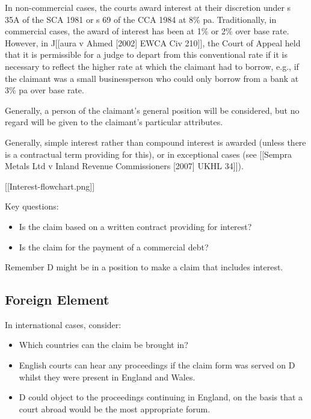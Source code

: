 \documentclass[
]{article}
\providecommand{\tightlist}{%
  \setlength{\itemsep}{0pt}\setlength{\parskip}{0pt}}
\begin{document}
In non-commercial cases, the courts award interest at their discretion
under s 35A of the SCA 1981 or s 69 of the CCA 1984 at 8\% pa.
Traditionally, in commercial cases, the award of interest has been at
1\% or 2\% over base rate. However, in J{[}{[}aura v Ahmed {[}2002{]}
EWCA Civ 210{]}{]}, the Court of Appeal held that it is permissible for
a judge to depart from this conventional rate if it is necessary to
reflect the higher rate at which the claimant had to borrow, e.g., if
the claimant was a small businessperson who could only borrow from a
bank at 3\% pa over base rate.

Generally, a person of the claimant's general position will be
considered, but no regard will be given to the claimant's particular
attributes.

Generally, simple interest rather than compound interest is awarded
(unless there is a contractual term providing for this), or in
exceptional cases (see {[}{[}Sempra Metals Ltd v Inland Revenue
Commissioners {[}2007{]} UKHL 34{]}{]}).

{[}{[}Interest-flowchart.png{]}{]}

Key questions:

\begin{itemize}
\tightlist
\item
  Is the claim based on a written contract providing for interest?
\item
  Is the claim for the payment of a commercial debt?
\end{itemize}

Remember D might be in a position to make a claim that includes
interest.

\hypertarget{foreign-element}{%
\subsection{Foreign Element}\label{foreign-element}}

In international cases, consider:

\begin{itemize}
\tightlist
\item
  Which countries can the claim be brought in?
\item
  English courts can hear any proceedings if the claim form was served
  on D whilst they were present in England and Wales.
\item
  D could object to the proceedings continuing in England, on the basis
  that a court abroad would be the most appropriate forum.
\end{itemize}
\end{document}
